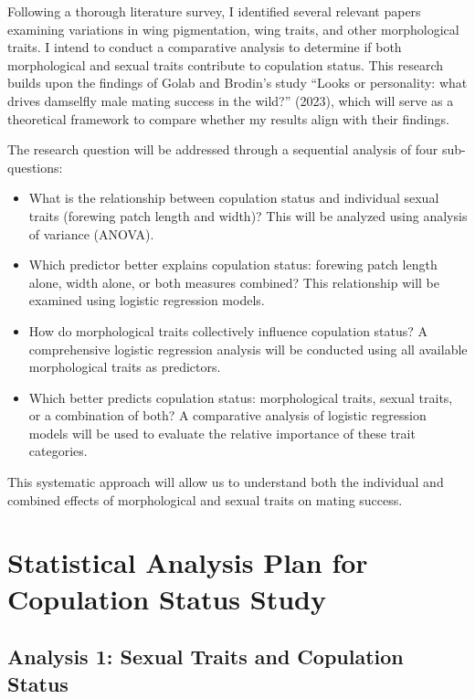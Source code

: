 \documentclass[
]{article}
\providecommand{\tightlist}{%
  \setlength{\itemsep}{0pt}\setlength{\parskip}{0pt}}
\begin{document}
Following a thorough literature survey, I identified several relevant
papers examining variations in wing pigmentation, wing traits, and other
morphological traits. I intend to conduct a comparative analysis to
determine if both morphological and sexual traits contribute to
copulation status. This research builds upon the findings of Golab and
Brodin's study ``Looks or personality: what drives damselfly male mating
success in the wild?'' (2023), which will serve as a theoretical
framework to compare whether my results align with their findings.

The research question will be addressed through a sequential analysis of
four sub-questions:

\begin{itemize}
\tightlist
\item
  What is the relationship between copulation status and individual
  sexual traits (forewing patch length and width)? This will be analyzed
  using analysis of variance (ANOVA).
\item
  Which predictor better explains copulation status: forewing patch
  length alone, width alone, or both measures combined? This
  relationship will be examined using logistic regression models.
\item
  How do morphological traits collectively influence copulation status?
  A comprehensive logistic regression analysis will be conducted using
  all available morphological traits as predictors.
\item
  Which better predicts copulation status: morphological traits, sexual
  traits, or a combination of both? A comparative analysis of logistic
  regression models will be used to evaluate the relative importance of
  these trait categories.
\end{itemize}

This systematic approach will allow us to understand both the individual
and combined effects of morphological and sexual traits on mating
success.

\hypertarget{statistical-analysis-plan-for-copulation-status-study}{%
\section{Statistical Analysis Plan for Copulation Status
Study}\label{statistical-analysis-plan-for-copulation-status-study}}

\hypertarget{analysis-1-sexual-traits-and-copulation-status}{%
\subsection{Analysis 1: Sexual Traits and Copulation
Status}\label{analysis-1-sexual-traits-and-copulation-status}}
\end{document}

